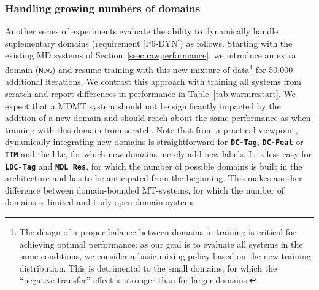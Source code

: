 \documentclass[11pt,a4paper]{article}
\newcommand{\fyDone}[1]{\done[FY]\Todo[FY:]{\textcolor{orange}{#1}}}
\newcommand{\domain}[1]{\texttt{\textsc{#1}}}
\newcommand{\system}[1]{\texttt{\textbf{#1}}}
\begin{document}
\subsubsection{Handling growing numbers of domains}
Another series of experiments evaluate the ability to dynamically handle suplementary domains (requirement [P6-DYN]) as follows. Starting with the existing MD systems of Section~\ref{ssec:rawperformance}, we introduce an extra domain (\domain{News}) and resume training with this new mixture of data\footnote{The design of a proper balance between domains in training is critical for achieving optimal performance: as our goal is to evaluate all systems in the same conditions, we consider a basic mixing policy based on the new training distribution. This is detrimental to the small domains, for which the ``negative transfer'' effect is stronger than for larger domains.} for 50,000 additional iterations.\fyDone{Training regime of continuation} We contrast this approach with training all systems from scratch and report differences in performance in Table~\ref{tab:warmrestart}.
We expect that a MDMT system should not be significantly impacted by the addition of a new domain and should reach about the same performance as when training with this domain from scratch. Note that from a practical viewpoint, dynamically integrating new domains is straightforward for \system{DC-Tag}, \system{DC-Feat} or \system{TTM} and the like, for which new domains merely add new labels. It is less easy for \system{LDC-Tag} and \system{MDL~Res}\fyDone{Complete effects of new domain}, for which the number of possible domains is built in the architecture and has to be anticipated from the beginning. This makes another difference between domain-bounded MT-systems, for which the number of domains is limited and truly open-domain systems.%
\end{document}
